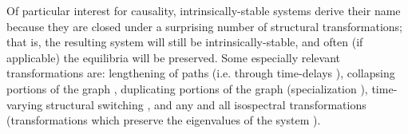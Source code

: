 \documentclass[12pt]{article}
\begin{document}
Of particular interest for causality, intrinsically-stable systems derive their name because they are closed under a surprising number of structural transformations; that is, the resulting system will still be intrinsically-stable, and often (if applicable) the equilibria will be preserved. Some especially relevant transformations are: lengthening of paths (i.e. through time-delays \cite{ReberIntrinsic}), collapsing portions of the graph \cite{IsospectralReduction}, duplicating portions of the graph (specialization \cite{Specialization}), time-varying structural switching \cite{Switched}, and any and all isospectral transformations (transformations which preserve the eigenvalues of the system \cite{IsospectralBook}).
\end{document}
